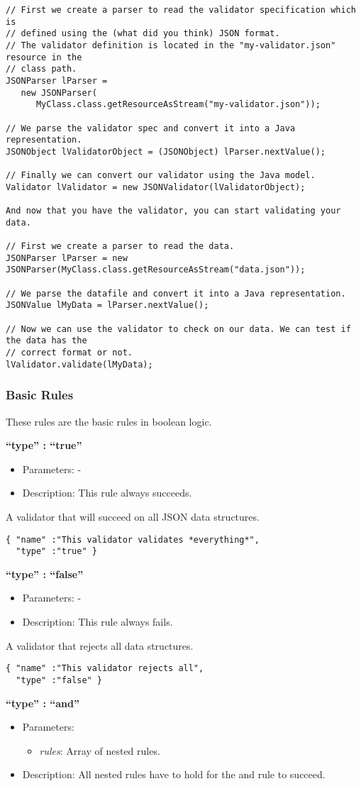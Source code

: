 \documentclass[a4paper]{article}
\newcommand{\ruledef}[3]{
\medskip
\textbf{#1}

\begin{itemize}
\setlength{\itemsep}{1pt}
\setlength{\parskip}{0pt}
\setlength{\parsep}{0pt}
   \item Parameters: #2
   \item Description: #3
\end{itemize}
}
\newcommand{\rulename}[1]{\textbf{``type'' : ``#1''}}
\newcommand{\param}[1]{\textsl{#1}:}
\begin{document}
\medskip
\begin{lstlisting}[basicstyle=\ttfamily\scriptsize{}]
// First we create a parser to read the validator specification which is 
// defined using the (what did you think) JSON format.
// The validator definition is located in the "my-validator.json" resource in the
// class path.
JSONParser lParser = 
   new JSONParser(
      MyClass.class.getResourceAsStream("my-validator.json"));

// We parse the validator spec and convert it into a Java representation.
JSONObject lValidatorObject = (JSONObject) lParser.nextValue();

// Finally we can convert our validator using the Java model.
Validator lValidator = new JSONValidator(lValidatorObject);

And now that you have the validator, you can start validating your data.

// First we create a parser to read the data. 
JSONParser lParser = new JSONParser(MyClass.class.getResourceAsStream("data.json"));

// We parse the datafile and convert it into a Java representation.
JSONValue lMyData = lParser.nextValue();

// Now we can use the validator to check on our data. We can test if the data has the 
// correct format or not. 
lValidator.validate(lMyData);
\end{lstlisting}
\medskip

\subsubsection{Basic Rules}

These rules are the basic rules in boolean logic. 

\ruledef{\rulename{true}}{-}{This rule always succeeds.}

A validator that will succeed on all JSON data structures.	
\begin{lstlisting}
{ "name" :"This validator validates *everything*",
  "type" :"true" }
\end{lstlisting}

\ruledef{\rulename{false}}{-}{This rule always fails.}

A validator that rejects all data structures.
\begin{lstlisting}
{ "name" :"This validator rejects all",
  "type" :"false" }
\end{lstlisting}

\label{and}
\ruledef{\rulename{and}}{\begin{itemize} \item \param{rules} Array of nested rules. \end{itemize}}{All nested rules have to hold for the and rule to succeed.}
\end{document}
